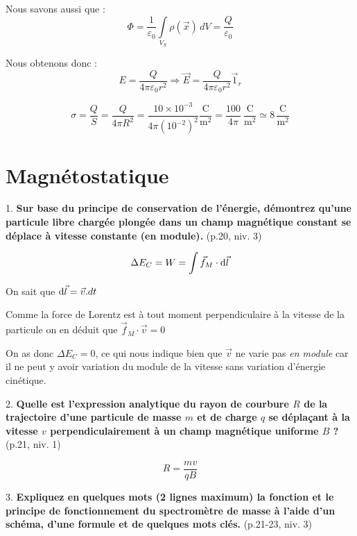 \documentclass[british,french,11pt, a4paper, openany]{book}
\begin{document}
		Nous savons aussi que : $$ \Phi = \dfrac{1}{\varepsilon_0} \int \limits_{V_S} \rho (\vec x) \, dV = \dfrac{Q}{\varepsilon_0} $$
			
		Nous obtenons donc : $$ E = \dfrac{Q}{4\pi \varepsilon_0 r^2} \Rightarrow \vec E = \dfrac{Q}{4\pi \varepsilon_0 r^2} \vec 1_r $$
		
		\vspace{0,5cm}
		
			
		$$ \sigma = \dfrac{Q}{S} = \dfrac{Q}{4\pi R^2} = \dfrac{10\times 10^{-3}}{4\pi (10^{-2})^2} \dfrac{\mathrm{C}}{\mathrm{m}^2} = \dfrac{100}{4\pi}\ \dfrac{\mathrm{C}}{\mathrm{m}^2} \simeq 8\,\dfrac{\mathrm{C}}{\mathrm{m}^2}$$
		
		\vspace{0,5cm}
				
				
		\newpage
		\renewcommand{\quest}[4]{#1. \textbf{#4} (p.#2, niv. #3)}
		\section{Magnétostatique}
		
		\quest{1}{20}{3}{Sur base du principe de conservation de l’énergie, démontrez qu’une particule libre chargée plongée dans un champ magnétique constant se déplace à vitesse constante (en module).}
		
		$$\Delta E_C = W = \int \vec f_M \cdot {\rm d}\vec l$$
		
		On sait que ${\rm d}\vec l = \vec v . dt$
		
		Comme la force de Lorentz est à tout moment perpendiculaire à la vitesse de la particule on en déduit que $\vec f_M \cdot \vec v = 0$
		
		On as donc $\Delta E_C = 0$, ce qui nous indique bien que $\vec v$ ne varie pas \emph{en module} car il ne peut y avoir variation du module de la vitesse sans variation d'énergie cinétique.
		
		\quest{2}{21}{1}{Quelle est l’expression analytique du rayon de courbure $R$ de la trajectoire d’une particule de masse $m$ et de charge $q$ se déplaçant à la vitesse $v$ perpendiculairement à un champ magnétique uniforme $B$ ?}
		
		$$ R = \dfrac{mv}{qB}$$
		
		\quest{3}{21-23}{3}{Expliquez en quelques mots (2 lignes maximum) la fonction et le principe de fonctionnement du spectromètre de masse à l’aide d’un schéma, d’une formule et de quelques mots clés.}
		
\end{document}
